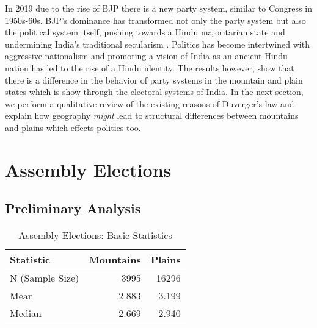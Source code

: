 \vspace{0.3cm}
In 2019 due to the rise of BJP there is a new party system, similar to Congress in 1950s-60s. BJP's dominance has transformed not only the party system but also the political system itself, pushing towards a Hindu majoritarian state and undermining India's traditional secularism \citep{jaffrelot2020bjp}.  Politics has become intertwined with aggressive nationalism and promoting a vision of India as an ancient Hindu nation has led to the rise of a Hindu identity. The results however, show that there is a difference in the behavior of party systems in the mountain and plain states which is show through the electoral systems of India. In the next section, we perform a qualitative review of the existing reasons of Duverger's law and explain how geography \textit{might} lead to structural differences between mountains and plains which effects politics too.





\section{Assembly Elections}
\subsection{Preliminary Analysis}
\begin{table}[h!]
    \centering
    \begin{tabular}{|l|r|r|}
    \hline
    \textbf{Statistic} & \textbf{Mountains} & \textbf{Plains} \\ \hline
    N (Sample Size) & 3995 & 16296 \\
    Mean & 2.883 & 3.199 \\
    Median & 2.669 & 2.940 \\ \hline
    \end{tabular}
    \caption{Assembly Elections: Basic Statistics}
    \label{tab:assembly_summary_statistics}
    \end{table}
    
